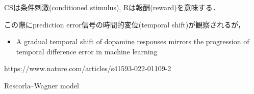 CSは条件刺激(conditioned stimulus), Rは報酬(reward)を意味する．

この際にprediction error信号の時間的変位(temporal shift)が観察されるが，

\begin{itemize}
\item A gradual temporal shift of dopamine responses mirrors the progression of temporal difference error in machine learning
\end{itemize}
https://www.nature.com/articles/s41593-022-01109-2


Rescorla–Wagner model
